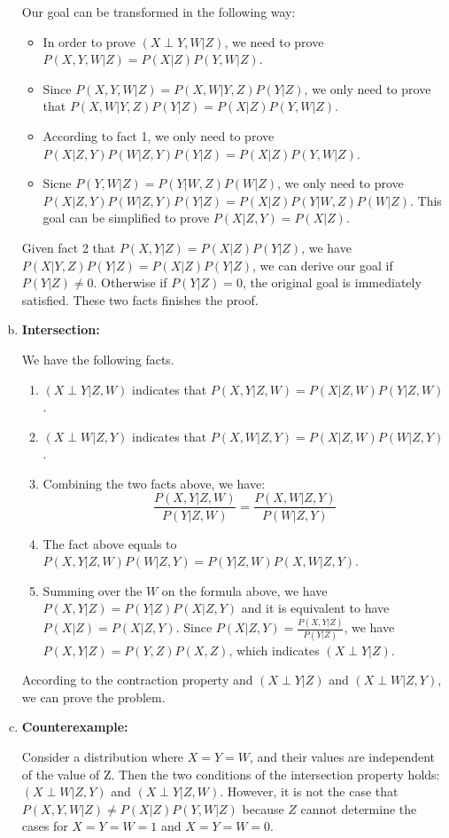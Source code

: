 \documentclass[notitlepage]{article}
\begin{document}
\begin{enumerate}[(a)]
Our goal can be transformed in the following way:

\begin{itemize}
\item In order to prove $(X\perp Y,W|Z)$, we need to prove $P(X,Y,W|Z)=P(X|Z)P(Y,W|Z)$. 
\item Since $P(X,Y,W|Z)=P(X,W|Y,Z)P(Y|Z)$, we only need to prove that $P(X,W|Y,Z)P(Y|Z)=P(X|Z)P(Y,W|Z)$. 
\item According to fact 1, we only need to prove $P(X|Z,Y)P(W|Z,Y)P(Y|Z)=P(X|Z)P(Y,W|Z)$. 
\item Sicne $P(Y,W|Z)=P(Y|W,Z)P(W|Z)$, we only need to prove $P(X|Z,Y)P(W|Z,Y)P(Y|Z)=P(X|Z)P(Y|W,Z)P(W|Z)$. This goal can be simplified to prove $P(X|Z,Y)=P(X|Z)$.
\end{itemize}

Given fact 2 that $P(X,Y|Z)=P(X|Z)P(Y|Z)$, we have $P(X|Y,Z)P(Y|Z)=P(X|Z)P(Y|Z)$, we can derive our goal if $P(Y|Z)\neq 0$. Otherwise if $P(Y|Z)=0$, the original goal is immediately satisfied. These two facts finishes the proof. 

\item {\bf Intersection:} 

We have the following facts.

\begin{enumerate}[1.]
\item $(X\perp Y |Z,W)$ indicates that $P(X,Y|Z,W)=P(X|Z,W)P(Y|Z,W)$.
\item $(X\perp W |Z,Y)$ indicates that $P(X,W|Z,Y)=P(X|Z,W)P(W|Z,Y)$.
\item Combining the two facts above, we have: $$\frac{P(X,Y|Z,W)}{P(Y|Z,W)}=\frac{P(X,W|Z,Y)}{P(W|Z,Y)}$$
\item The fact above equals to $P(X,Y|Z,W)P(W|Z,Y)=P(Y|Z,W)P(X,W|Z,Y)$.
\item Summing over the $W$ on the formula above, we have $P(X,Y|Z)=P(Y|Z)P(X|Z,Y)$ and it is equivalent to have $P(X|Z)=P(X|Z,Y)$. Since $P(X|Z,Y)=\frac{P(X,Y|Z)}{P(Y|Z)}$, we have $P(X,Y|Z)=P(Y,Z)P(X,Z)$, which indicates $(X\perp Y|Z)$.
\end{enumerate}

According to the contraction property and $(X\perp Y|Z)$ and $(X\perp W |Z,Y)$, we can prove the problem.


\item {\bf Counterexample:}

Consider a distribution where $X = Y = W$, and their values are independent
of the value of Z. Then the two conditions of the intersection property holds: $(X \perp W | Z, Y )$ and $(X \perp Y | Z, W)$. However, it is not the case that $P(X,Y,W|Z) \neq P(X|Z)P(Y,W|Z)$
because $Z$ cannot determine the cases for $X = Y = W = 1$ and $X = Y = W = 0$.

\end{enumerate}
\end{document}
